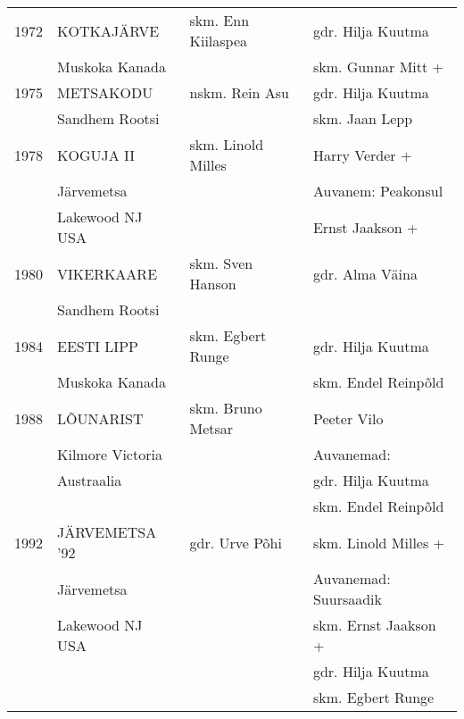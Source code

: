 \documentclass[12pt]{extbook}
\begin{document}
{\begin{tabular*}{1.0\textwidth}{@{\extracolsep{\fill}}@{}l@{}@{}l@{}@{}l@{}@{}l@{}}
	1972	&	KOTKAJ\"ARVE			&	skm. Enn Kiilaspea		&	gdr. Hilja Kuutma\\
			&	Muskoka Kanada			&							&	skm. Gunnar Mitt +\\[2mm]
	1975	&	METSAKODU				&	nskm. Rein Asu			&	gdr. Hilja Kuutma\\
			&	Sandhem Rootsi			&							&	skm. Jaan Lepp\\[2mm]
	1978	&	KOGUJA II				&	skm. Linold Milles		&	Harry Verder +\\
			&	J\"arvemetsa			&							&	Auvanem: Peakonsul\\
			&	Lakewood NJ USA			&							&	Ernst Jaakson +\\[2mm]
	1980	&	VIKERKAARE				&	skm. Sven Hanson		&	gdr. Alma V\"aina\\
			&	Sandhem Rootsi			&							&	\\[2mm]
	1984	&	EESTI LIPP				&	skm. Egbert Runge		&	gdr. Hilja Kuutma\\
			&	Muskoka Kanada			&							&	skm. Endel Reinp\~old\\[2mm]
	1988	&	L\~OUNARIST				&	skm. Bruno Metsar		&	Peeter Vilo\\
			&	Kilmore Victoria		&							&	Auvanemad:\\
			&	Austraalia				&							&	gdr. Hilja Kuutma\\
			&							&							&	skm. Endel Reinp\~old	\\[2mm]
	1992	&	J\"ARVEMETSA '92		&	gdr. Urve P\~ohi		&	skm. Linold Milles +\\
			&	J\"arvemetsa			&							&	Auvanemad: Suursaadik\\
			&	Lakewood NJ USA			&							&	skm. Ernst Jaakson +\\
			&							&							&	gdr. Hilja Kuutma\\
			&							&							&	skm. Egbert Runge\\[2mm]
\end{tabular*}}
\end{document}

